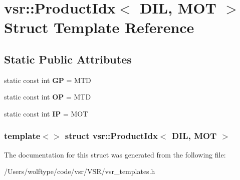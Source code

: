 \hypertarget{structvsr_1_1_product_idx_3_01_d_i_l_00_01_m_o_t_01_4}{\section{vsr\-:\-:Product\-Idx$<$ D\-I\-L, M\-O\-T $>$ Struct Template Reference}
\label{structvsr_1_1_product_idx_3_01_d_i_l_00_01_m_o_t_01_4}
}
\subsection*{Static Public Attributes}
\begin{DoxyCompactItemize}
\item 
\hypertarget{structvsr_1_1_product_idx_3_01_d_i_l_00_01_m_o_t_01_4_abb06fea5202629b4f41b8a32fdb1216b}{static const int {\bfseries G\-P} = M\-T\-D}\label{structvsr_1_1_product_idx_3_01_d_i_l_00_01_m_o_t_01_4_abb06fea5202629b4f41b8a32fdb1216b}

\item 
\hypertarget{structvsr_1_1_product_idx_3_01_d_i_l_00_01_m_o_t_01_4_a0a0898baaaa95515142976f7dbbc8b49}{static const int {\bfseries O\-P} = M\-T\-D}\label{structvsr_1_1_product_idx_3_01_d_i_l_00_01_m_o_t_01_4_a0a0898baaaa95515142976f7dbbc8b49}

\item 
\hypertarget{structvsr_1_1_product_idx_3_01_d_i_l_00_01_m_o_t_01_4_ab9b28e41f38a0ef8d6af26ea326fb53e}{static const int {\bfseries I\-P} = M\-O\-T}\label{structvsr_1_1_product_idx_3_01_d_i_l_00_01_m_o_t_01_4_ab9b28e41f38a0ef8d6af26ea326fb53e}

\end{DoxyCompactItemize}
\subsubsection*{template$<$$>$ struct vsr\-::\-Product\-Idx$<$ D\-I\-L, M\-O\-T $>$}



The documentation for this struct was generated from the following file\-:\begin{DoxyCompactItemize}
\item 
/\-Users/wolftype/code/vsr/\-V\-S\-R/vsr\-\_\-templates.\-h\end{DoxyCompactItemize}
